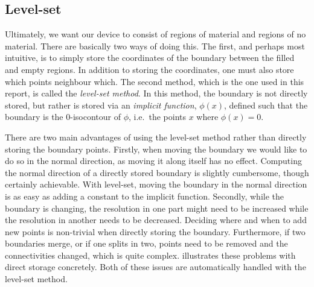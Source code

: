 \subsection{Level-set}\label{sec:level-set}

Ultimately, we want our device to consist of regions of material and regions of
no material.
There are basically two ways of doing this.
The first, and perhaps most intuitive,
is to simply store the coordinates of the boundary between the filled and empty
regions.
In addition to storing the coordinates, one must also store which points
neighbour which.
The second method, which is the one used in this report, is called
the \emph{level-set method}.
In this method, the boundary is not directly stored, but rather is stored via an
\emph{implicit function}, $\phi(x)$, defined such that the boundary is the
0-isocontour of $\phi$, i.e.\ the points $x$ where $\phi(x)=0$.

There are two main advantages of using the level-set method rather than
directly storing the boundary points.
Firstly, when moving the boundary we would like to do so in the normal
direction, as moving it along itself has no effect.
Computing the normal direction of a directly stored boundary is slightly cumbersome,
though certainly achievable.
With level-set, moving the boundary in the normal direction is as easy as adding
a constant to the implicit function.
Secondly, while the boundary is changing, the resolution in one part might need
to be increased while the resolution in another needs to be decreased. Deciding
where and when to add new points is non-trivial when directly storing the
boundary. Furthermore, if two boundaries merge, or if one splits in two, points
need to be removed and the connectivities changed, which is quite complex.
 illustrates these problems with direct storage concretely.
Both of these issues are automatically handled with the level-set method.

